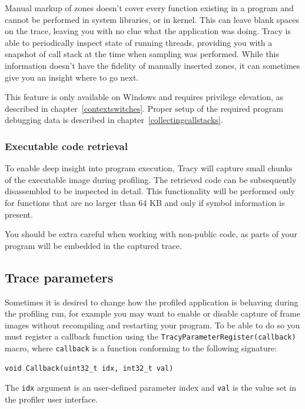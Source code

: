 \documentclass[hidelinks,titlepage,a4paper]{article}
\begin{document}
Manual markup of zones doesn't cover every function existing in a program and cannot be performed in system libraries, or in kernel. This can leave blank spaces on the trace, leaving you with no clue what the application was doing. Tracy is able to periodically inspect state of running threads, providing you with a snapshot of call stack at the time when sampling was performed. While this information doesn't have the fidelity of manually inserted zones, it can sometimes give you an insight where to go next.

This feature is only available on Windows and requires privilege elevation, as described in chapter~\ref{contextswitches}. Proper setup of the required program debugging data is described in chapter~\ref{collectingcallstacks}.

\subsubsection{Executable code retrieval}
\label{executableretrieval}

To enable deep insight into program execution, Tracy will capture small chunks of the executable image during profiling. The retrieved code can be subsequently disassembled to be inspected in detail. This functionality will be performed only for functions that are no larger than 64 KB and only if symbol information is present.

You should be extra careful when working with non-public code, as parts of your program will be embedded in the captured trace.

\subsection{Trace parameters}
\label{traceparameters}

Sometimes it is desired to change how the profiled application is behaving during the profiling run, for example you may want to enable or disable capture of frame images without recompiling and restarting your program. To be able to do so you must register a callback function using the \texttt{TracyParameterRegister(callback)} macro, where \texttt{callback} is a function conforming to the following signature:

\begin{lstlisting}
void Callback(uint32_t idx, int32_t val)
\end{lstlisting}

The \texttt{idx} argument is an user-defined parameter index and \texttt{val} is the value set in the profiler user interface.
\end{document}
